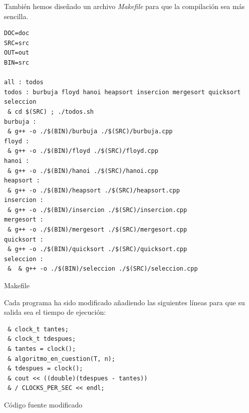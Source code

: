 \documentclass[12pt,spanish]{article}
\begin{document}
También hemos diseñado un archivo \textit{Makefile} para que la compilación sea más sencilla.
\begin{listing}[H]
\begin{verbatim}
DOC=doc
SRC=src
OUT=out
BIN=src

all : todos
todos : burbuja floyd hanoi heapsort insercion mergesort quicksort seleccion
 & cd $(SRC) ; ./todos.sh
burbuja : 
 & g++ -o ./$(BIN)/burbuja ./$(SRC)/burbuja.cpp
floyd : 
 & g++ -o ./$(BIN)/floyd ./$(SRC)/floyd.cpp
hanoi : 
 & g++ -o ./$(BIN)/hanoi ./$(SRC)/hanoi.cpp
heapsort : 
 & g++ -o ./$(BIN)/heapsort ./$(SRC)/heapsort.cpp
insercion : 
 & g++ -o ./$(BIN)/insercion ./$(SRC)/insercion.cpp
mergesort : 
 & g++ -o ./$(BIN)/mergesort ./$(SRC)/mergesort.cpp
quicksort : 
 & g++ -o ./$(BIN)/quicksort ./$(SRC)/quicksort.cpp
seleccion :
 &  & g++ -o ./$(BIN)/seleccion ./$(SRC)/seleccion.cpp
\end{verbatim}
\caption{Makefile}
\end{listing}
\newpage
Cada programa ha sido modificado añadiendo las siguientes líneas para que su salida sea el tiempo de ejecución:

\begin{listing}[H]
\begin{verbatim}
 & clock_t tantes;
 & clock_t tdespues;
 & tantes = clock();
 & algoritmo_en_cuestion(T, n);
 & tdespues = clock();
 & cout << ((double)(tdespues - tantes))
 & / CLOCKS_PER_SEC << endl;
\end{verbatim}
\caption{Código fuente modificado}
\end{listing}
\end{document}
